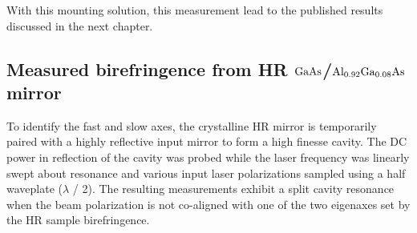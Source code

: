 With this mounting solution, this measurement lead to the published results discussed in the next chapter.

\iffalse
\subsection{Measured birefringence from HR \texorpdfstring{$\mathrm{GaAs}$}{gaas}/\texorpdfstring{$\mathrm{Al_{0.92}Ga_{0.08}As}$}{algaas} mirror}

To identify the fast and slow axes, the crystalline HR mirror is temporarily paired with a highly reflective input mirror to form a high finesse cavity. The DC power in reflection of the cavity was probed while the laser frequency was linearly swept about resonance and various input laser polarizations sampled using a half waveplate ($\lambda$ / 2). The resulting measurements exhibit a split cavity resonance when the beam polarization is not co-aligned with one of the two eigenaxes set by the HR sample birefringence.

